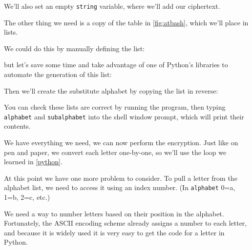 		We'll also set an empty \texttt{string} variable, where we'll add our ciphertext.
		
		
	
		The other thing we need is a copy of the table in \autoref*{fig:atbash}, which we'll place in lists.
		
		We could do this by manually defining the list:
		
		
		
		but let's save some time and take advantage of one of Python's libraries to automate the generation of this list:
		
		
		
		Then we'll create the substitute alphabet by copying the list in reverse:
		
		
		
		\ifprint\else You can check these lists are correct by running the program, then typing \texttt{alphabet} and \texttt{subalphabet} into the shell window prompt, which will print their contents. \fi
	
		We have everything we need, we can now perform the encryption. Just like on pen and paper, we convert each letter one-by-one, so we'll use the loop we learned in \autoref{python}.
	
		
		
		\pagebreak[3] %
		
		
		At this point we have one more problem to consider. To pull a letter from the alphabet list, we need to access it using an index number. (In \texttt{alphabet} 0=a, 1=b, 2=c, etc.)
		
		We need a way to number letters based on their position in the alphabet. Fortunately, the ASCII encoding scheme already assigns a number to each letter, and because it is widely used it is very easy to get the  code for a letter in Python.
		
		\pagebreak[2] %
		
